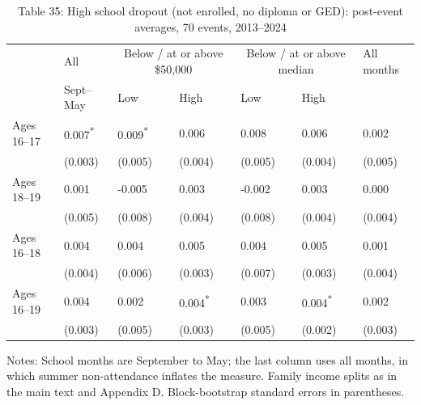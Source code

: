 \documentclass[12pt]{article}
\begin{document}
\begin{table}
\centering
\caption{Table 35: High school dropout (not enrolled, no diploma or GED): post-event averages, 70 events, 2013--2024}

\small
\begin{tabular}{p{}p{}p{}p{}p{}p{}p{}}
\toprule
 & All & \multicolumn{2}{c}{Below / at or above \$50,000} & \multicolumn{2}{c}{Below / at or above median} & All months \\

 & Sept--May & Low & High & Low & High & \\
\midrule
Ages 16--17 & 0.007\textsuperscript{*} & 0.009\textsuperscript{*} & 0.006 & 0.008 & 0.006 & 0.002 \\
 & (0.003) & (0.005) & (0.004) & (0.005) & (0.004) & (0.005) \\
Ages 18--19 & 0.001 & -0.005 & 0.003 & -0.002 & 0.003 & 0.000 \\
 & (0.005) & (0.008) & (0.004) & (0.008) & (0.004) & (0.004) \\
Ages 16--18 & 0.004 & 0.004 & 0.005 & 0.004 & 0.005 & 0.001 \\
 & (0.004) & (0.006) & (0.003) & (0.007) & (0.003) & (0.004) \\
Ages 16--19 & 0.004 & 0.002 & 0.004\textsuperscript{*} & 0.003 & 0.004\textsuperscript{*} & 0.002 \\
 & (0.003) & (0.005) & (0.003) & (0.005) & (0.002) & (0.003) \\
\bottomrule
\end{tabular}



\noindent\small Notes: School months are September to May; the last column uses all months, in which summer non-attendance inflates the measure. Family income splits as in the main text and Appendix D. Block-bootstrap standard errors in parentheses.

\end{table}
\end{document}
